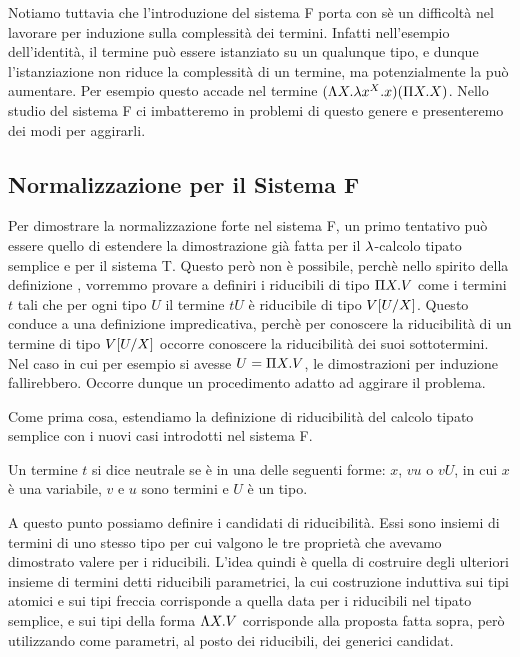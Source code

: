 \documentclass[]{marticle}
\begin{document}
Notiamo tuttavia che l'introduzione del sistema F porta con s\`e un difficolt\`a
nel lavorare per induzione sulla complessit\`a dei termini. Infatti nell'esempio
dell'identit\`a, il termine pu\`o essere istanziato su un qualunque tipo, e
dunque l'istanziazione non riduce la complessit\`a di un termine, ma
potenzialmente la pu\`o aumentare. Per esempio questo accade nel termine $(\L X.
\l x^X. x)(\P X. X)$. Nello studio del sistema F ci imbatteremo in problemi di
questo genere e presenteremo dei modi per aggirarli.

\subsection{Normalizzazione per il Sistema F}
Per dimostrare la normalizzazione forte nel sistema F, un primo tentativo pu\`o
essere quello di estendere la dimostrazione gi\`a fatta per il $\l$-calcolo
tipato semplice e per il sistema T. Questo per\`o non \`e possibile, perch\`e
nello spirito della definizione , vorremmo
provare a definiri i riducibili di tipo $\P X. V$ come i termini $t$ tali che
per ogni tipo $U$ il termine $tU$ \`e riducibile di tipo $V\sub{U}{X}$. Questo
conduce a una definizione impredicativa, perch\`e per conoscere la
riducibilit\`a di un termine di tipo $V\sub{U}{X}$ occorre conoscere la
riducibilit\`a dei suoi sottotermini. Nel caso in cui per esempio si avesse $U =
\P X.V$, le dimostrazioni per induzione fallirebbero. Occorre dunque un
procedimento adatto ad aggirare il problema.

Come prima cosa, estendiamo la definizione di riducibilit\`a del calcolo tipato
semplice con i nuovi casi introdotti nel sistema F.
\begin{block}[Definizione]
    Un termine $t$ si dice neutrale se \`e in una delle seguenti forme: $x$,
    $vu$ o $vU$, in cui $x$ \`e una variabile, $v$ e $u$ sono termini e $U$ \`e
    un tipo.
\end{block}

A questo punto possiamo definire i candidati di riducibilit\`a. Essi sono
insiemi di termini di uno stesso tipo per cui valgono le tre propriet\`a che
avevamo dimostrato valere per i riducibili. L'idea quindi \`e quella di
costruire degli ulteriori insieme di termini detti riducibili parametrici, la
cui costruzione induttiva sui tipi atomici e sui tipi freccia corrisponde a
quella data per i riducibili nel tipato semplice, e sui tipi della forma $\L
X.V$ corrisponde alla proposta fatta sopra, per\`o utilizzando come parametri,
al posto dei riducibili, dei generici candidat.
\end{document}
